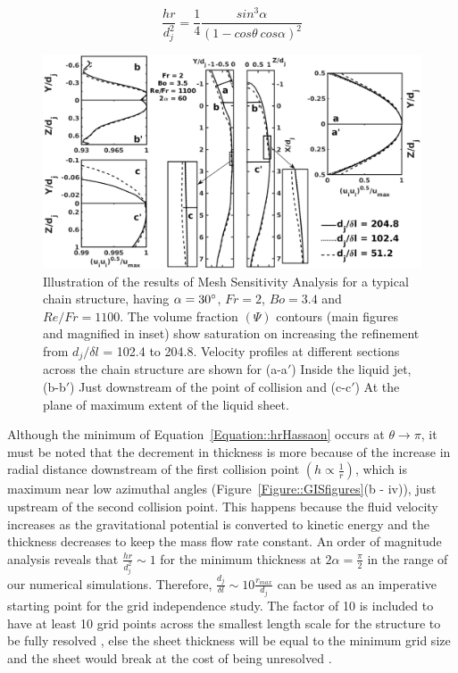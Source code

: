 \documentclass[%
aip,
sd,%
amsmath,amssymb,
preprint,%
author-year,%
]{revtex4-1}
\begin{document}
\begin{equation}\label{Equation::hrHassaon}
\frac{hr}{d_j^2} = 	\frac{1}{4}\frac{sin^3\alpha}{(1-cos\theta\:cos\alpha)^2}
\end{equation}
\begin{figure}
	\centering
	\includegraphics[width=\linewidth]{gis}
	\caption{Illustration of the results of Mesh Sensitivity Analysis for a typical chain structure, having $\alpha = 30\degree$, $Fr = 2$, $Bo = 3.4$ and $Re/Fr = 1100$. The volume fraction $\left(\Psi\right)$ contours (main figures and magnified in inset) show saturation on increasing the refinement from $d_j/\delta l$ = 102.4 to 204.8. Velocity profiles at different sections across the chain structure are shown for (a-a$'$) Inside the liquid jet, (b-b$'$) Just downstream of the point of collision  and (c-c$'$) At the plane of maximum extent of the liquid sheet.}
	\label{Figure::GISplots}
\end{figure}
Although the minimum of Equation~\ref{Equation::hrHassaon} occurs at $\theta \to \pi$, it must be noted that the decrement in thickness is more because of the increase in radial distance downstream of the first collision point $\left(h \propto \frac{1}{r}\right)$, which is maximum near low azimuthal angles (Figure~\ref{Figure::GISfigures}(b - iv)), just upstream of the second collision point. This happens because the fluid velocity increases as the gravitational potential is converted to kinetic energy and the thickness decreases to keep the mass flow rate constant. An order of magnitude analysis reveals that $\frac{hr}{d_j^2} \sim 1$ for the minimum thickness at $2\alpha = \frac{\pi}{2}$ in the range of our numerical simulations. Therefore, $\frac{d_j}{\delta l} \sim 10\frac{r_{max}}{d_j}$ can be used as an imperative starting point for the grid independence study. The factor of 10 is included to have at least 10 grid points across the smallest length scale for the structure to be fully resolved \citep{ling2015multiscale}, else the sheet thickness will be equal to the minimum grid size and the sheet would break at the cost of being unresolved \citep{chen2013high}.
\end{document}
